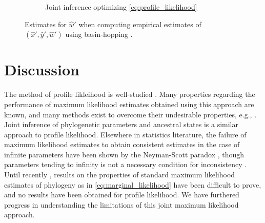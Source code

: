 \documentclass{article}
\begin{document}
\begin{figure}
\begin{subfigure}{.45\linewidth}
\caption[short]{Joint inference optimizing \eqref{eq:profile_likelihood}}
\end{subfigure}
\caption{
    Estimates for $\hat{w}'$ when computing empirical estimates of $(\hat{x}', \hat{y}', \hat{w}')$ using basin-hopping \cite{Wales1997}.
}
\label{fig:bl-general-inconsistency}
\end{figure}

\section*{Discussion}

The method of profile likleihood is well-studied \cite{Murphy2000-ry}.
Many properties regarding the performance of maximum likelihood estimates obtained using this approach are known, and many methods exist to overcome their undesirable properties, e.g., \cite{Geman1982}.
Joint inference of phylogenetic parameters and ancestral states \cite{Sagulenko2017-jo} is a similar approach to profile likelihood.
Elsewhere in statistics literature, the failure of maximum likelihood estimates to obtain consistent estimates in the case of infinite parameters have been shown by the Neyman-Scott paradox \cite{Neyman1948-tt}, though parameters tending to infinity is not a necessary condition for inconsistency \cite{LeCam1990}.
Until recently \cite{RoyChoudhury2015-ta}, results on the properties of standard maximum likelihood estimates of phylogeny as in \eqref{eq:marginal_likelihood} have been difficult to prove, and no results have been obtained for profile likelihood.
We have furthered progress in understanding the limitations of this joint maximum likelihood approach.
\end{document}
